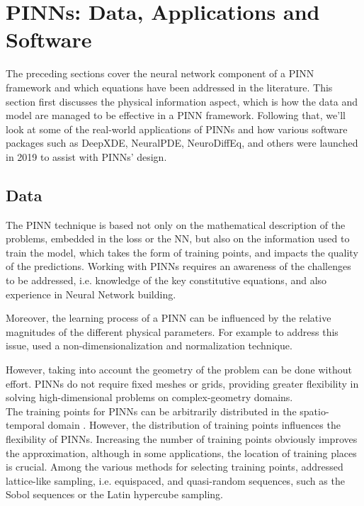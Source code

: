 \documentclass[pdflatex,sn-basic]{sn-jnl}%
\theoremstyle{thmstyleone}%
\theoremstyle{thmstyletwo}%
\theoremstyle{thmstylethree}%
\begin{document}
\FloatBarrier








\section{PINNs: Data, Applications and Software}

%
The preceding sections cover the neural network component of a PINN framework and which equations have been addressed in the literature.
This section first discusses the physical information aspect, which is how the data and model are managed to be effective in a PINN framework.
Following that, we'll look at some of the real-world applications of PINNs and how various software packages such as DeepXDE, NeuralPDE, NeuroDiffEq, and others were launched in 2019 to assist with PINNs' design. 
%


\subsection{Data}
The PINN technique is based not only on the mathematical description of the problems, embedded in the loss or the NN, but also on the information used to train the model, which takes the form of training points, and impacts the quality of the predictions. Working with PINNs requires an awareness of the challenges to be addressed, i.e. knowledge of the key constitutive equations, and also experience in Neural Network building.

Moreover, the learning process of a PINN can be influenced by the relative magnitudes of the different physical parameters. For example to address this issue, \cite{Kis2020_MachineLearningCardiovascular_YanKYH}  used a non-dimensionalization and normalization technique.

However, taking into account the geometry of the problem can be done without effort.
PINNs do not require fixed meshes or grids, providing greater flexibility in solving high-dimensional problems on complex-geometry domains. 
\\
\noindent
The training points for PINNs can be arbitrarily distributed in the spatio-temporal domain \citep{Pan2019_FpinnsFractionalPhysics_LuPLK}.
However, the distribution of training points influences the flexibility of PINNs. 
Increasing the number of training points obviously improves the approximation, although in some applications, the location of training places is crucial. 
Among the various methods for selecting training points, \cite{Pan2019_FpinnsFractionalPhysics_LuPLK} addressed lattice-like sampling, i.e. equispaced, and quasi-random sequences, such as the Sobol sequences or the Latin hypercube sampling.
\end{document}
